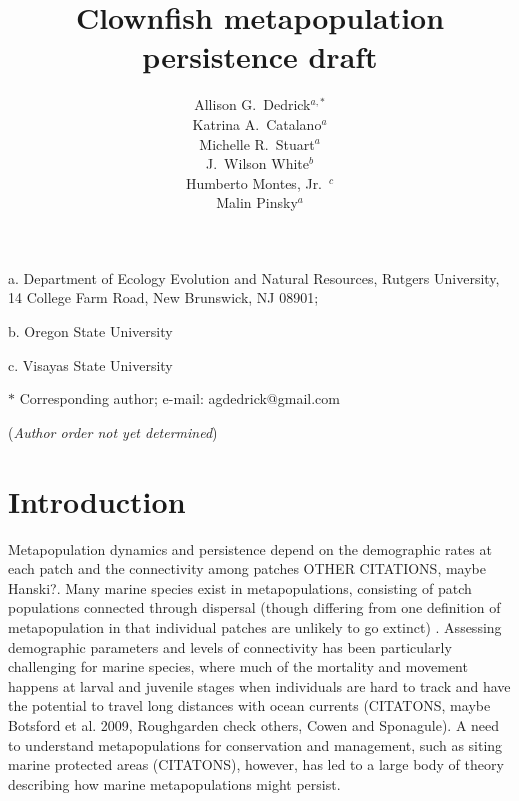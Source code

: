 \documentclass[12pt, oneside]{article}   	%
\author{}
\author{Allison G.\ Dedrick$^{a, \ast}$ \\
Katrina A.\ Catalano$^a$ \\
Michelle R.\ Stuart$^a$ \\
J.\ Wilson White$^b$ \\
Humberto Montes, Jr.\ $^c$ \\
Malin Pinsky$^a$}
\title{Clownfish metapopulation persistence draft}
\date{}
\begin{document}
\renewcommand{\topfraction}{0.95}
\maketitle{}

\noindent{} a. Department of Ecology Evolution and Natural Resources, Rutgers University, 14 College Farm Road, New Brunswick, NJ 08901;

\noindent{} b. Oregon State University

\noindent{} c. Visayas State University

\noindent{} $\ast$ Corresponding author; e-mail: agdedrick@gmail.com

(\textit{Author order not yet determined})


\bigskip




\linenumbers{}
\modulolinenumbers[3]

\section*{Introduction}

Metapopulation dynamics and persistence depend on the demographic rates at each patch and the connectivity among patches \citep[e.g.][]{hastings_persistence_2006} OTHER CITATIONS, maybe Hanski?. Many marine species exist in metapopulations, consisting of patch populations connected through dispersal (though differing from one definition of metapopulation in that individual patches are unlikely to go extinct) \citep{kritzer2006marine}. Assessing demographic parameters and levels of connectivity has been particularly challenging for marine species, where much of the mortality and movement happens at larval and juvenile stages when individuals are hard to track and have the potential to travel long distances with ocean currents \citep[e.g.][]{kritzer2006marine}(CITATONS, maybe Botsford et al. 2009, Roughgarden check others, Cowen and Sponagule). A need to understand metapopulations for conservation and management, such as siting marine protected areas (CITATONS), however, has led to a large body of theory describing how marine metapopulations might persist. %
\end{document}
